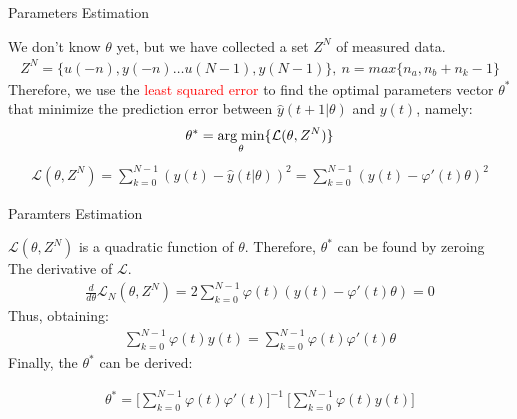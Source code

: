\documentclass[aspectratio=169,hyperref={pdfpagelabels=false}]{beamer}
\begin{document}
\begin{frame}{Parameters Estimation}
      \begin{block}{}
        We don't know $\theta$ yet, but we have collected a set $Z^N$ of measured data.
        \begin{align*}
          Z^N = \{u(-n), y(-n)\dots u(N-1), y(N-1) \}, \: n = max\{n_a,n_{b}+n_{k}-1\}
        \end{align*}
      Therefore, we use the \textcolor{red}{least squared error} to find the optimal parameters vector $\theta^*$ that minimize the prediction error between $\hat{y}(t+1|\theta)$ and $y(t)$, namely: 
      \begin{align*}
        \theta^* = \underset{\theta}{\text{arg\;min}} \{\mathcal{L}(\theta, Z^N)\}
      \end{align*}
      \begin{align*}
        \mathcal{L}(\theta, Z^N) = \sum_{k=0}^{N-1}(y(t)-\hat{y}(t|\theta))^2 = \sum_{k=0}^{N-1}(y(t)-\varphi'(t)\theta)^2 
      \end{align*}
    \end{block}
\end{frame}

\begin{frame}{Paramters Estimation}
  \begin{block}{}
      $\mathcal{L}(\theta, Z^N)$ is a quadratic function of $\theta$. Therefore, $\theta^*$ can be found by zeroing The derivative of $\mathcal{L}$.
  \begin{align*}
    \frac{d}{d\theta} \mathcal{L}_N(\theta, Z^N) = 2\sum_{k=0}^{N-1}\varphi(t)(y(t)-\varphi'(t)\theta)  = 0 
  \end{align*}
Thus, obtaining: 
\begin{align*}
  \sum_{k=0}^{N-1}\varphi(t)y(t) = \sum_{k=0}^{N-1}\varphi(t)\varphi'(t)\theta
\end{align*}
Finally, the $\theta^*$ can be derived: 
\begin{center}
    \begin{align*}
      \boxed{\theta^* = \Biggr[\sum_{k=0}^{N-1}\varphi(t)\varphi'(t)\Biggr]^{-1} \: \Biggr[\sum_{k=0}^{N-1}\varphi(t)y(t)\Biggr]}
    \end{align*}
\end{center}
\end{block}
\end{frame}
\end{document}
